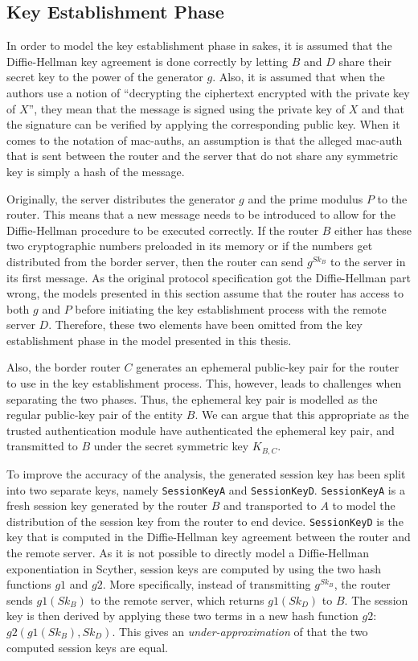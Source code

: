 \subsection{Key Establishment Phase}
\label{subsec:sakes-keys}
In order to model the key establishment phase in \gls{sakes}, it is assumed that the Diffie-Hellman key agreement is done correctly by letting $B$ and $D$ share their secret key to the power of the generator $g$. Also, it is assumed that when the authors use a notion of ``decrypting the ciphertext encrypted with the private key of $X$'', they mean that the message is signed using the private key of $X$ and that the signature can be verified by applying the corresponding public key. When it comes to the notation of \gls{mac-auth}s, an assumption is that the alleged \gls{mac-auth} that is sent between the router and the server that do not share any symmetric key is simply a hash of the message.

Originally, the server distributes the generator $g$ and the prime modulus $P$ to the router. This means that a new message needs to be introduced to allow for the Diffie-Hellman procedure to be executed correctly. If the router $B$ either has these two cryptographic numbers preloaded in its memory or if the numbers get distributed from the border server, then the router can send $g^{Sk_B}$ to the server in its first message. As the original protocol specification got the Diffie-Hellman part wrong, the models presented in this section assume that the router has access to both $g$ and $P$ before initiating the key establishment process with the remote server $D$. Therefore, these two elements have been omitted from the key establishment phase in the model presented in this thesis.


Also, the border router $C$ generates an ephemeral public-key pair for the router to use in the key establishment process. This, however, leads to challenges when separating the two phases. Thus, the ephemeral key pair is modelled as the regular public-key pair of the entity $B$. We can argue that this appropriate as the trusted authentication module have authenticated the ephemeral key pair, and transmitted to $B$ under the secret symmetric key $K_{B,C}$.


To improve the accuracy of the analysis, the generated session key has been split into two separate keys, namely \texttt{SessionKeyA} and \texttt{SessionKeyD}. \texttt{SessionKeyA} is a fresh session key generated by the router $B$ and transported to $A$ to model the distribution of the session key from the router to end device. \texttt{SessionKeyD} is the key that is computed in the Diffie-Hellman key agreement between the router and the remote server. As it is not possible to directly model a Diffie-Hellman exponentiation in Scyther, session keys are computed by using the two hash functions $g1$ and $g2$. More specifically, instead of transmitting $g^{Sk_B}$, the router sends $g1(Sk_B)$ to the remote server, which returns $g1(Sk_D)$ to $B$. The session key is then derived by applying these two terms in a new hash function $g2$: $g2(g1(Sk_B), Sk_D)$. This gives an \emph{under-approximation} of that the two computed session keys are equal.


